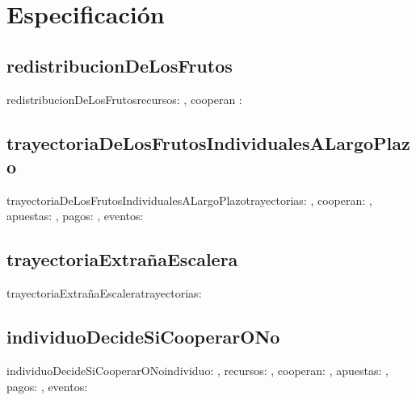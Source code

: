 \documentclass[10pt,a4paper]{article}
\begin{document}
\maketitle
\section{Especificación}



\subsection{redistribucionDeLosFrutos}
\begin{proc}{redistribucionDeLosFrutos}{\In recursos: \TLista{\float}, \In cooperan : \TLista{\bool}} {\TLista{\float}}
	\requiere {-}
	\asegura{-}
\end{proc}


\subsection{trayectoriaDeLosFrutosIndividualesALargoPlazo}
\begin{proc}{trayectoriaDeLosFrutosIndividualesALargoPlazo}{\Inout trayectorias: \TLista{\TLista{\float}}, \In cooperan: \TLista{\bool}, \In apuestas: \TLista{\TLista{\float}}, \In pagos: \TLista{\TLista{\float}}, \In eventos: \TLista{\TLista{\float}}} {}
	\requiere {-}
	\asegura{-}
\end{proc}


\subsection{trayectoriaExtrañaEscalera}
\begin{proc}{trayectoriaExtrañaEscalera}{\In trayectorias: \TLista{\float}} {\bool}
	\requiere {-}
	\asegura{-}
\end{proc}


\subsection{individuoDecideSiCooperarONo}
\begin{proc}{individuoDecideSiCooperarONo}{\In individuo: \nat, \In recursos: \TLista{\float}, \Inout cooperan: \TLista{\bool}, \In apuestas: \TLista{\TLista{\float}}, \In pagos: \TLista{\TLista{\float}}, \In eventos: \TLista{\TLista{\nat}}} {}
	\requiere {-}
	\asegura{-}
\end{proc}
\end{document}
